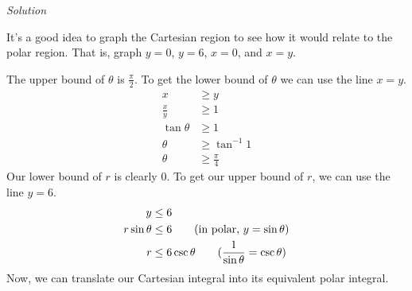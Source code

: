 \documentclass{article}
\newcommand{\Solution}{\textit{Solution}}
\begin{document}
\Solution

It's a good idea to graph the Cartesian region to see how it would relate to the polar region. That is, graph $y=0$, $y=6$, $x=0$, and $x=y$.
\begin{center}
\end{center}
The upper bound of $\theta$ is $\displaystyle\frac{\pi}{2}$. To get the lower bound of $\theta$ we can use the line $x=y$.
\begin{align*}
    x&\geq y\\
    \frac{x}{y}&\geq 1\\
    \tan \theta &\geq 1\\
    \theta & \geq \tan^{-1} 1\\
    \theta & \geq \frac{\pi}{4}
\end{align*}
Our lower bound of $r$ is clearly $0$. To get our upper bound of $r$, we can use the line $y=6$.
\begin{align*}
    y &\leq 6\\
    r\sin \theta &\leq 6\tag{in polar, $y=\sin\theta$}\\
    r &\leq 6\csc \theta \tag{$\displaystyle \frac{1}{\sin\theta}=\csc\theta$}
\end{align*}
Now, we can translate our Cartesian integral into its equivalent polar integral.
\end{document}
